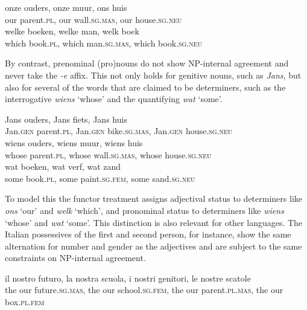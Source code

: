 \documentclass[output=paper
                ,modfonts
                ,nonflat
	        ,collection
	        ,collectionchapter
	        ,collectiontoclongg
 	        ,biblatex
                ,babelshorthands
                ,newtxmath
                ,draftmode
                ,colorlinks, citecolor=brown
]{./langsci/langscibook}
\begin{document}
\begin{exe} 
\ex\label{ons}
\gll onze ouders,         onze muur,             ons huis     \\
     our parent.\textsc{pl}, our wall.\textsc{sg.mas}, our house.\textsc{sg.neu} \\
\ex\label{welk} 
\gll welke boeken,        welke man,              welk boek   \\
     which book.\textsc{pl}, which man.\textsc{sg.mas}, which book.\textsc{sg.neu} \\
\end{exe} 

\noindent
By contrast, prenominal (pro)nouns do not show NP-internal agreement and  
never take the \emph{-e} affix. This not only holds for genitive nouns, 
such as \emph{Jans}, but also for several of the words that are claimed 
to be determiners, such as the interrogative \emph{wiens} `whose' 
and the quantifying \emph{wat} `some'. 

\begin{exe} 
\ex\label{jans}
\gll  Jans ouders,                   Jans fiets,                      Jans huis \\ 
      Jan.\textsc{gen} parent.\textsc{pl}, Jan.\textsc{gen} bike.\textsc{sg.mas}, Jan.\textsc{gen} house.\textsc{sg.neu} \\
\ex\label{wiens}
\gll  wiens ouders,          wiens muur,              wiens huis \\ 
      whose parent.\textsc{pl}, whose wall.\textsc{sg.mas}, whose house.\textsc{sg.neu} \\
\ex\label{wat}
\gll  wat boeken,         wat verf,                wat zand  \\
      some book.\textsc{pl}, some paint.\textsc{sg.fem}, some sand.\textsc{sg.neu} \\
\end{exe} 

\noindent
To model this the functor treatment assigns adjectival status 
to determiners like \emph{ons} `our' and \emph{welk} `which', 
and pronominal status to determiners like \emph{wiens} `whose' and
\emph{wat} `some'.  
This distinction is also relevant for other languages. The Italian 
possessives of the first and second person, for instance, 
show the same alternation for number and gender as the adjectives
and are subject to the same constraints on NP-internal agreement.

\begin{exe}  
\ex 
\gll  il nostro futuro, la nostra scuola, i nostri genitori, le nostre scatole \\
      the our future.\textsc{sg.mas}, the our school.\textsc{sg.fem}, the our parent.\textsc{pl.mas}, the our box.\textsc{pl.fem} \\ 
\end{exe} 
\end{document}
